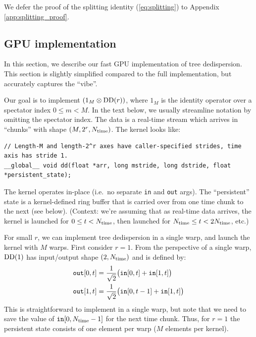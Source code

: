 \documentclass{article}
\numberwithin{equation}{section}   %
\def\DD{{\rm DD}}
\def\nn{\nonumber}
\begin{document}
We defer the proof of the splitting identity (\ref{eq:splitting}) to 
Appendix \ref{app:splitting_proof}.

\subsection{GPU implementation}
\label{ssec:gpu_implementation}

In this section, we describe our fast GPU implementation of tree dedispersion.
This section is slightly simplified compared to the full implementation, but
accurately captures the ``vibe''.

Our goal is to implement $(1_M \otimes \DD(r))$, where $1_M$ is the identity operator
over a spectator index $0 \le m < M$.
In the text below, we usually streamline notation by omitting the spectator index.
The data is a real-time stream which arrives in ``chunks'' with shape $(M, 2^r, N_{\rm time})$.
The kernel looks like:
\begin{center}
\begin{verbatim}
// Length-M and length-2^r axes have caller-specified strides, time axis has stride 1.
__global__ void dd(float *arr, long mstride, long dstride, float *persistent_state);
\end{verbatim}
\end{center}
The kernel operates in-place (i.e.\ no separate {\tt in} and {\tt out} args).
The ``persistent'' state is a kernel-defined ring buffer that is carried over from one
time chunk to the next (see below).
(Context: we're assuming that as real-time data arrives, the kernel is launched for
$0 \le t < N_{\rm time}$, then launched for $N_{\rm time} \le t < 2N_{\rm time}$, etc.)

For small $r$, we can implement tree dedispersion in a single warp, and launch the
kernel with $M$ warps.
First consider $r=1$. 
From the perspective of a single warp, $\DD(1)$ has input/output shape $(2,N_{\rm time})$
and is defined by:
\begin{align}
{\tt out}[0,t] &= \frac{1}{\sqrt{2}} 
  \big( {\tt in}[0,t] + {\tt in}[1,t] \big) \nn \\
{\tt out}[1,t] &= \frac{1}{\sqrt{2}}
  \big( {\tt in}[0,t-1] + {\tt in}[1,t] \big)
\label{eq:DD1}
\end{align}
This is straightforward to implement in a single warp, but note that we need to save
the value of ${\tt in}[0,N_{\rm time}-1]$ for the next time chunk.
Thus, for $r=1$ the persistent state consists of one element per warp ($M$ elements per kernel).
\end{document}
